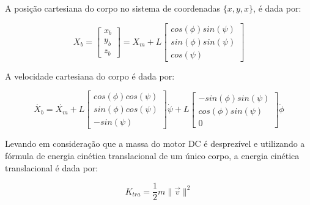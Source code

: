 \documentclass[10pt]{article}
\begin{document}
\quad A posição cartesiana do corpo no sistema de coordenadas $\{x, y, x\}$,
é dada por:

\begin{equation}
    X_b = 
    \begin{bmatrix}
        x_b \\
        y_b \\
        z_b
    \end{bmatrix} = X_m + L
    \begin{bmatrix}
        cos(\phi) sin(\psi) \\
        sin(\phi) sin(\psi) \\
        cos(\psi)
    \end{bmatrix}
\end{equation}

\quad A velocidade cartesiana do corpo é dada por:

\begin{equation}
    \dot{X_b} = \dot{X_m} + L
    \begin{bmatrix}
        cos(\phi) cos(\psi) \\
        sin(\phi) cos(\psi) \\
        -sin(\psi)
    \end{bmatrix} \dot{\psi} + L
    \begin{bmatrix}
        -sin(\phi) sin(\psi) \\
        cos(\phi) sin(\psi) \\
        0
    \end{bmatrix} \dot{\phi}
\end{equation}

\quad Levando em consideração que a massa do motor DC é desprezível e
utilizando a fórmula de energia cinética translacional de um único corpo,
a energia cinética translacional é dada por:

\begin{equation}
    K_{tra} = \frac{1}{2} m \|\vec{v}\|^2
\end{equation}
\end{document}
